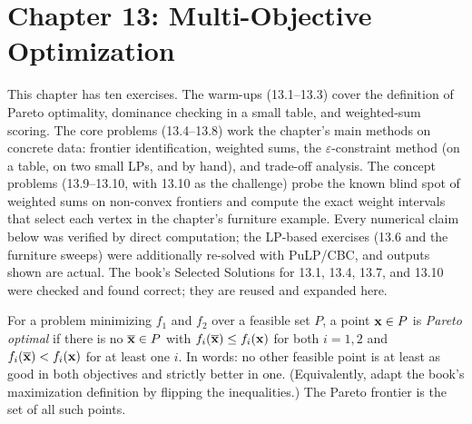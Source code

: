 
\section{Chapter 13: Multi-Objective Optimization}

This chapter has ten exercises. The warm-ups (13.1--13.3) cover the
definition of Pareto optimality, dominance checking in a small table, and
weighted-sum scoring. The core problems (13.4--13.8) work the chapter's main
methods on concrete data: frontier identification, weighted sums, the
$\varepsilon$-constraint method (on a table, on two small LPs, and by hand),
and trade-off analysis. The concept problems (13.9--13.10, with 13.10 as the
challenge) probe the known blind spot of weighted sums on non-convex
frontiers and compute the exact weight intervals that select each vertex in
the chapter's furniture example. Every numerical claim below was verified by
direct computation; the LP-based exercises (13.6 and the furniture sweeps)
were additionally re-solved with PuLP/CBC, and outputs shown are actual. The
book's Selected Solutions for 13.1, 13.4, 13.7, and 13.10 were checked and
found correct; they are reused and expanded here.


For a problem minimizing $f_1$ and $f_2$ over a feasible set $P$, a point
$\mathbf{x} \in P$ is \emph{Pareto optimal} if there is no $\overline{\mathbf{x}} \in P$ with
$f_i(\overline{\mathbf{x}}) \leq f_i(\mathbf{x})$ for both $i = 1, 2$ and
$f_i(\overline{\mathbf{x}}) < f_i(\mathbf{x})$ for at least one $i$. In words: no other
feasible point is at least as good in both objectives and strictly better in
one. (Equivalently, adapt the book's maximization definition by flipping the
inequalities.) The Pareto frontier is the set of all such points.


